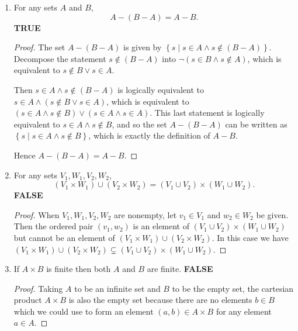\documentclass[11pt]{article}
\newcommand{\cbr}[1]{\left\{#1\right\}}
\begin{document}
\begin{enumerate}
\begin{enumerate}[label=(\alph*)]
\begin{proof}
            Then let $x\in f(A_0\cup A_1)$, so that there exists $a\in A_0\cup A_1$ such that $f(a) = x$. Thus either $a\in A_0$ or $a\in A_1$ (or both), so that $x = f(a) \in f(A_0)\cup f(A_1)$, and since $x$ was arbitrary, $f(A_0\cup A_1) \subset f(A_0)\cup f(A_1)$. 

            Then let $x\in f(A_0)\cup f(A_1)$, so that $x\in f(A_0)$ or $x\in f(A_1)$ (or both). So either there exists $a_0\in A_0$ such that $x = f(a_0)$ or there exists $a_1\in A_1$ such that $x = f(a_1)$ (or both), and since $a_0,a_1\in A_0\cup A_1$, it follows that $x\in f(A_0\cup A_1)$. Since $x$ was arbitrary the reverse inclusion $f(A_0\cup A_1) \supset f(A_0)\cup f(A_1)$ holds.

            Hence $f(A_0\cup A_1) = f(A_0)\cup f(A_1)$.
        \end{proof}
        \item For any sets $A$ and $B$, \[A-(B-A) = A-B.\]
        \textbf{TRUE} \begin{proof}
            The set $A-(B-A)$ is given by $\cbr{s\mid s\in A \land s\not\in(B-A)}$. Decompose the statement $s\not\in (B-A)$ into $\lnot (s\in B \land s\not\in A)$, which is equivalent to $s\not\in B \lor s\in A$.

            Then $s\in A \land s\not\in(B-A)$ is logically equivalent to $s\in A \land (s\not\in B \lor s\in A)$, which is equivalent to $(s\in A \land s\not\in B) \lor (s\in A \land s\in A)$. This last statement is logically equivalent to $s\in A \land s\not\in B$, and so the set $A-(B-A)$ can be written as $\cbr{s\mid s\in A \land s\not\in B}$, which is exactly the definition of $A-B$. 

            Hence $A-(B-A) = A-B$.
        \end{proof}
        \item For any sets $V_1, W_1, V_2, W_2$, \[(V_1\times W_1)\cup (V_2\times W_2) = (V_1\cup V_2)\times (W_1\cup W_2).\]
        \textbf{FALSE} \begin{proof}
            When $V_1, W_1, V_2, W_2$ are nonempty, let $v_1\in V_1$ and $w_2\in W_2$ be given. Then the ordered pair $(v_1,w_2)$ is an element of $(V_1\cup V_2)\times (W_1\cup W_2)$ but cannot be an element of $(V_1\times W_1)\cup (V_2\times W_2)$. In this case we have $(V_1\times W_1)\cup (V_2\times W_2) \subsetneq (V_1\cup V_2)\times (W_1\cup W_2)$.
        \end{proof}
        \item If $A\times B$ is finite then both $A$ and $B$ are finite.
        \textbf{FALSE} \begin{proof}
            Taking $A$ to be an infinite set and $B$ to be the empty set, the cartesian product $A\times B$ is also the empty set because there are no elements $b\in B$ which we could use to form an element $(a,b) \in A\times B$ for any element $a\in A$.


\end{proof}
\end{enumerate}
\end{enumerate}
\end{document}

